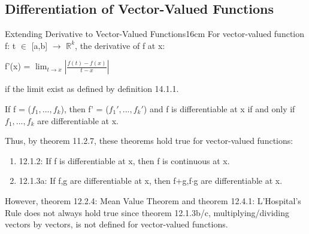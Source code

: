 \subsection{ Differentiation of Vector-Valued Functions }

    \begin{definition}{Extending Derivative to Vector-Valued Functions}{16cm}
        For vector-valued function f: t $\in$ [a,b] $\rightarrow$ $\mathbb{R}^k$,
        the derivative of f at x:

        \hspace{0.5cm}
        f'(x) = $\lim_{t \rightarrow x} |\frac{f(t)-f(x)}{t-x}|$

        if the limit exist as defined by {\color{blue} definition 14.1.1}.

        \vspace{0.2cm}

        If f = ($f_1, ... , f_k$), then f' = ($f_1', ... , f_k'$)
        and f is differentiable at x if and only if $f_1, ... , f_k$ are
        differentiable at x.

        \vspace{0.1cm}

        Thus, by {\color{red} theorem 11.2.7}, these theorems hold true
        for vector-valued functions:

        \begin{enumerate}[label=-, leftmargin=0.7cm, itemsep=0.1cm]
            \item {\color{red} 12.1.2}:
                If f is differentiable at x, then f is continuous at x.
            
            \item {\color{red} 12.1.3a}:
                If f,g are differentiable at x, then f+g,f$\cdot$g
                are differentiable at x. 
        \end{enumerate}

        \vspace{0.1cm}

        However, {\color{red} theorem 12.2.4: Mean Value Theorem}
        and {\color{red} theorem 12.4.1: L'Hospital's Rule}
        does not always hold true since {\color{red} theorem 12.1.3b/c},
        multiplying/dividing vectors by vectors,
        is not defined for vector-valued functions.
    \end{definition}

    \vspace{0.5cm}



